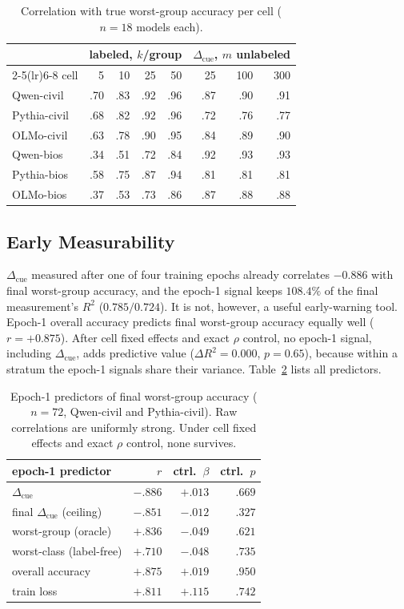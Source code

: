\documentclass[11pt]{article}
\newcommand{\cued}{\ensuremath{\Delta_{\mathrm{cue}}}}
\begin{document}
\begin{table}[t]
\centering\small
\setlength{\tabcolsep}{3.6pt}
\begin{tabular}{lrrrrrrr}
\toprule
 & \multicolumn{4}{c}{labeled, $k$/group} & \multicolumn{3}{c}{\cued{}, $m$ unlabeled} \\
\cmidrule(lr){2-5}\cmidrule(lr){6-8}
cell & 5 & 10 & 25 & 50 & 25 & 100 & 300 \\
\midrule
Qwen-civil   & .70 & .83 & .92 & .96 & .87 & .90 & .91 \\
Pythia-civil & .68 & .82 & .92 & .96 & .72 & .76 & .77 \\
OLMo-civil   & .63 & .78 & .90 & .95 & .84 & .89 & .90 \\
Qwen-bios    & .34 & .51 & .72 & .84 & .92 & .93 & .93 \\
Pythia-bios  & .58 & .75 & .87 & .94 & .81 & .81 & .81 \\
OLMo-bios    & .37 & .53 & .73 & .86 & .87 & .88 & .88 \\
\bottomrule
\end{tabular}
\caption{Correlation with true worst-group accuracy per cell ($n{=}18$
models each).}
\label{tab:label}
\end{table}

\subsection{Early Measurability}
\label{app:ew}
\cued{} measured after one of four training epochs already correlates
$-0.886$ with final worst-group accuracy, and the epoch-1 signal keeps
$108.4\%$ of the final measurement's $R^2$ ($0.785/0.724$). It is not,
however, a useful early-warning tool. Epoch-1 overall accuracy predicts final worst-group accuracy equally well ($r{=}{+}0.875$). After cell fixed effects and exact $\rho$ control, no epoch-1 signal, including \cued{}, adds predictive value ($\Delta R^2{=}0.000$, $p{=}0.65$), because within a stratum
the epoch-1 signals share their variance. Table~\ref{tab:ew} lists all
predictors.

\begin{table}[t]
\centering\small
\setlength{\tabcolsep}{4.5pt}
\begin{tabular}{lrrr}
\toprule
epoch-1 predictor & $r$ & ctrl.\ $\beta$ & ctrl.\ $p$ \\
\midrule
\cued{}                    & $-.886$ & $+.013$ & $.669$ \\
final \cued{} (ceiling)    & $-.851$ & $-.012$ & $.327$ \\
worst-group (oracle)       & $+.836$ & $-.049$ & $.621$ \\
worst-class (label-free)   & $+.710$ & $-.048$ & $.735$ \\
overall accuracy           & $+.875$ & $+.019$ & $.950$ \\
train loss                 & $+.811$ & $+.115$ & $.742$ \\
\bottomrule
\end{tabular}
\caption{Epoch-1 predictors of final worst-group accuracy
($n{=}72$, Qwen-civil and Pythia-civil). Raw correlations are uniformly
strong. Under cell fixed effects and exact $\rho$ control, none survives.}
\label{tab:ew}
\end{table}
\end{document}
